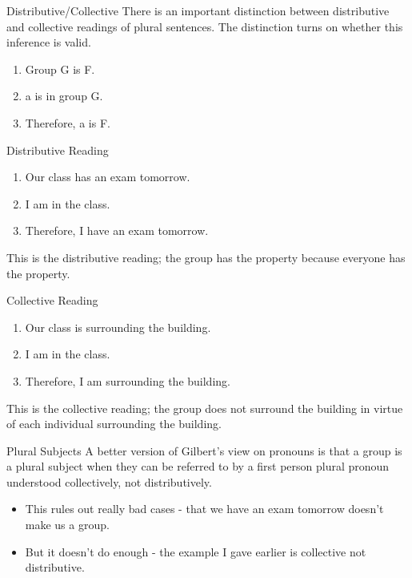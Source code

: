 \documentclass[
  ignorenonframetext,
]{beamer}
\providecommand{\tightlist}{%
  \setlength{\itemsep}{0pt}\setlength{\parskip}{0pt}}
\begin{document}
\begin{frame}{Distributive/Collective}
\protect\hypertarget{distributivecollective}{}
There is an important distinction between distributive and collective
readings of plural sentences. The distinction turns on whether this
inference is valid.

\begin{enumerate}
\tightlist
\item
  Group G is F.
\item
  a is in group G.
\item
  Therefore, a is F.
\end{enumerate}
\end{frame}

\begin{frame}{Distributive Reading}
\protect\hypertarget{distributive-reading}{}
\begin{enumerate}
\tightlist
\item
  Our class has an exam tomorrow.
\item
  I am in the class.
\item
  Therefore, I have an exam tomorrow.
\end{enumerate}

This is the distributive reading; the group has the property because
everyone has the property.
\end{frame}

\begin{frame}{Collective Reading}
\protect\hypertarget{collective-reading}{}
\begin{enumerate}
\tightlist
\item
  Our class is surrounding the building.
\item
  I am in the class.
\item
  Therefore, I am surrounding the building.
\end{enumerate}

This is the collective reading; the group does not surround the building
in virtue of each individual surrounding the building.
\end{frame}

\begin{frame}{Plural Subjects}
\protect\hypertarget{plural-subjects}{}
A better version of Gilbert's view on pronouns is that a group is a
plural subject when they can be referred to by a first person plural
pronoun understood collectively, not distributively.

\begin{itemize}
\tightlist
\item
  This rules out really bad cases - that we have an exam tomorrow
  doesn't make us a group.
\item
  But it doesn't do enough - the example I gave earlier is collective
  not distributive.
\end{itemize}
\end{frame}
\end{document}
